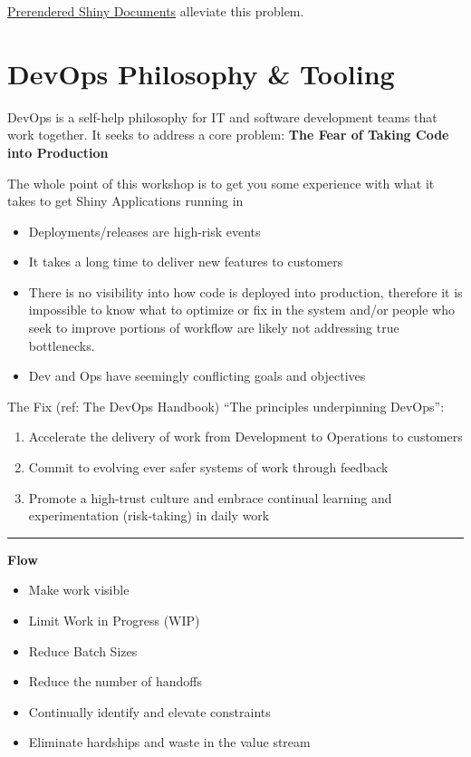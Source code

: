 \documentclass[]{book}
\providecommand{\tightlist}{%
  \setlength{\itemsep}{0pt}\setlength{\parskip}{0pt}}
\theoremstyle{definition}
\theoremstyle{definition}
\theoremstyle{definition}
\theoremstyle{remark}
\begin{document}
\href{https://rmarkdown.rstudio.com/authoring_shiny_prerendered.html}{Prerendered
Shiny Documents} alleviate this problem.

\hypertarget{devops-philosophy-tooling}{%
\chapter{DevOps Philosophy \& Tooling}\label{devops-philosophy-tooling}}

DevOps is a self-help philosophy for IT and software development teams
that work together. It seeks to address a core problem: \textbf{The Fear
of Taking Code into Production}

The whole point of this workshop is to get you some experience with what
it takes to get Shiny Applications running in

\begin{itemize}
\tightlist
\item
  Deployments/releases are high-risk events
\item
  It takes a long time to deliver new features to customers
\item
  There is no visibility into how code is deployed into production,
  therefore it is impossible to know what to optimize or fix in the
  system and/or people who seek to improve portions of workflow are
  likely not addressing true bottlenecks.
\item
  Dev and Ops have seemingly conflicting goals and objectives
\end{itemize}

The Fix (ref: The DevOps Handbook) ``The principles underpinning
DevOps'':

\begin{enumerate}
\def\labelenumi{\arabic{enumi}.}
\tightlist
\item
  Accelerate the delivery of work from Development to Operations to
  customers
\item
  Commit to evolving ever safer systems of work through feedback
\item
  Promote a high-trust culture and embrace continual learning and
  experimentation (risk-taking) in daily work
\end{enumerate}

\begin{center}\rule{0.5\linewidth}{\linethickness}\end{center}

\textbf{Flow}

\begin{itemize}
\tightlist
\item
  Make work visible
\item
  Limit Work in Progress (WIP)
\item
  Reduce Batch Sizes
\item
  Reduce the number of handoffs
\item
  Continually identify and elevate constraints
\item
  Eliminate hardships and waste in the value stream
\end{itemize}
\end{document}
